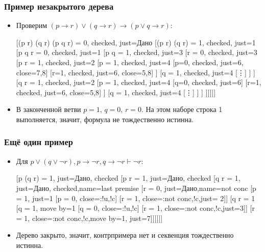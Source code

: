 \documentclass[10pt]{beamer}
\begin{document}
\begin{frame}
\frametitle{Пример незакрытого дерева}
\begin{itemize}
    \item Проверим $(p \to r) \lor (q \to r) \to (p \lor q \to r)$:
    \begin{tableau}{}
        [{(p \to r) \lor (q \to r) \to (p \lor q \to r) = 0}, checked, just=Дано
        [{(p \to r) \lor (q \to r) = 1}, checked, just=1
        [{p \lor q \to r = 0}, checked, just=1
        [{p \lor q = 1}, checked, just=3
        [{r = 0}, checked, just=3
        [{p \to r = 1}, checked, just=2
        [{p = 1}, checked, just=4
        [{p=0}, checked, just=6, close={7,8}]
        [{r=1}, checked, just=6, close={5,8}]
        ]
        [{q = 1}, checked, just=4
        [\vdots]
        ]
        ]
        [{q \to r = 1}, checked, just=2
        [{p = 1}, checked, just=4
        [{q=0}, checked, just=6]
        [{r=1}, checked, just=6, close={5,8}]
        ]
        [{q = 1}, checked, just=4
        [\vdots]
        ]
        ]
        ]]]]]
    \end{tableau}
    \item В законченной ветви $p=1,\,q=0,\,r=0$. На этом наборе строка 1 выполняется, значит, \pause формула не тождественно истинна.
\end{itemize}
\end{frame}

\begin{frame}
\frametitle{Ещё один пример}
\begin{itemize}
    \item Для $p \vee (q \vee \lnot r), p \to \lnot r, q \to \lnot r \vdash \lnot r$:
    \begin{tableau}{}
        [{p \lor (q \lor \lnot r) = 1}, just=Дано, checked
        [{p \to \lnot r = 1}, just=Дано, checked
        [{q \to \lnot r = 1}, just=Дано, checked,name=last premise
        [{\lnot r = 0}, just=Дано,name=not conc
        [{p = 1}, just={1}
        [{p = 0}, close={:!u,!c}]
        [{\lnot r = 1}, close={:not conc,!c},just={ 2}]]
        [{q \vee \lnot r = 1}
        [{q = 1}, move by=1
        [{q = 0}, close={:!u,!c}]
        [{\lnot r = 1}, close={:not conc,!c},just={3}]]
        [{\lnot r = 1}, close={:not conc,!c},move by=1, just={7}]]]]]]
    \end{tableau}
    \item Дерево закрыто, значит, \pause контрпримера нет и секвенция тождественно истинна.
\end{itemize}
\end{frame}
\end{document}
